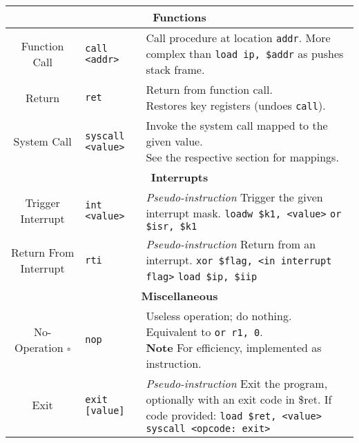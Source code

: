 \documentclass[10pt]{article}
\begin{document}
\begin{longtable}{|c|l|l|}
    \hline \hline
    \multicolumn{3}{|c|}{\textbf{Functions}} \\
    \hline
    Function Call & \texttt{call <addr>} & \makecell[l]{Call procedure at location \texttt{addr}.\\%
    More complex than \texttt{load ip, \$addr} as pushes stack frame.} \\
    \hline
    Return & \texttt{ret} & \makecell[l]{Return from function call.\\%
    Restores key registers (undoes \texttt{call}).} \\
    \hline
    System Call & \texttt{syscall <value>} & \makecell[l]{Invoke the system call mapped to the given value.\\%
    See the respective section for mappings.} \\
    \hline \hline
    \multicolumn{3}{|c|}{\textbf{Interrupts}} \\
    \hline
    Trigger Interrupt & \texttt{int <value>} & \makecell[l]{\textit{Pseudo-instruction}\\%
    Trigger the given interrupt mask.\\%
    \texttt{loadw \$k1, <value>}\\%
    \texttt{or \$isr, \$k1}} \\
    \hline
    Return From Interrupt & \texttt{rti} & \makecell[l]{\textit{Pseudo-instruction}\\%
    Return from an interrupt.\\%
    \texttt{xor \$flag, <in interrupt flag>}\\
    \texttt{load \$ip, \$iip}} \\
    \hline \hline
    \multicolumn{3}{|c|}{\textbf{Miscellaneous}} \\
    \hline
    No-Operation \(\square\) & \texttt{nop} & \makecell[l]{Useless operation; do nothing.\\%
    Equivalent to \texttt{or r1, 0}.\\%
    \textbf{Note} For efficiency, implemented as instruction.} \\
    \hline
    Exit & \texttt{exit [value]} & \makecell[l]{\textit{Pseudo-instruction}\\%
    Exit the program, optionally with an exit code in \$ret.\\%
    If code provided: \texttt{load \$ret, <value>}\\%
    \texttt{syscall <opcode: exit>}} \\
    \hline
\end{longtable}
\end{document}
